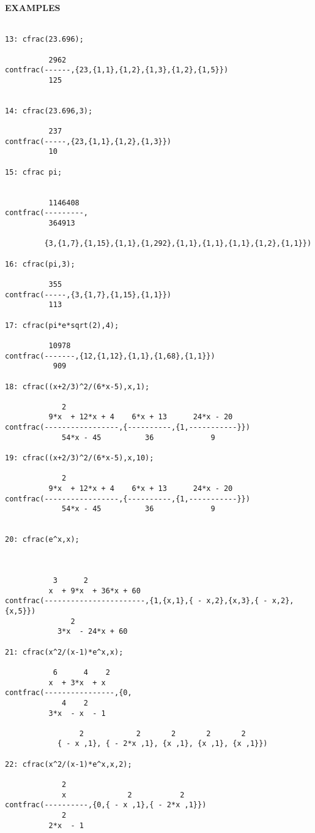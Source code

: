 \large{{\bf EXAMPLES}}\\ \\
\begin{verbatim}
13: cfrac(23.696);

          2962
contfrac(------,{23,{1,1},{1,2},{1,3},{1,2},{1,5}})
          125


14: cfrac(23.696,3);

          237
contfrac(-----,{23,{1,1},{1,2},{1,3}})
          10

15: cfrac pi;


          1146408
contfrac(---------,
          364913

         {3,{1,7},{1,15},{1,1},{1,292},{1,1},{1,1},{1,1},{1,2},{1,1}})

16: cfrac(pi,3);

          355
contfrac(-----,{3,{1,7},{1,15},{1,1}})
          113

17: cfrac(pi*e*sqrt(2),4);

          10978
contfrac(-------,{12,{1,12},{1,1},{1,68},{1,1}})
           909

18: cfrac((x+2/3)^2/(6*x-5),x,1);

             2
          9*x  + 12*x + 4    6*x + 13      24*x - 20
contfrac(-----------------,{----------,{1,-----------}})
             54*x - 45          36             9

19: cfrac((x+2/3)^2/(6*x-5),x,10);

             2
          9*x  + 12*x + 4    6*x + 13      24*x - 20
contfrac(-----------------,{----------,{1,-----------}})
             54*x - 45          36             9


20: cfrac(e^x,x);



           3      2
          x  + 9*x  + 36*x + 60
contfrac(-----------------------,{1,{x,1},{ - x,2},{x,3},{ - x,2},{x,5}})
               2
            3*x  - 24*x + 60

21: cfrac(x^2/(x-1)*e^x,x);

           6      4    2
          x  + 3*x  + x
contfrac(----------------,{0,
             4    2
          3*x  - x  - 1

                 2            2       2       2       2
            { - x ,1}, { - 2*x ,1}, {x ,1}, {x ,1}, {x ,1}})

22: cfrac(x^2/(x-1)*e^x,x,2);

             2
             x              2           2
contfrac(----------,{0,{ - x ,1},{ - 2*x ,1}})
             2
          2*x  - 1

\end{verbatim}

